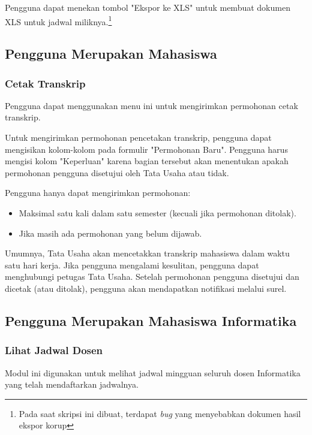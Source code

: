 Pengguna dapat menekan tombol "Ekspor ke XLS" untuk membuat dokumen XLS untuk jadwal miliknya.\footnote{Pada saat skripsi ini dibuat, terdapat \textit{bug} yang menyebabkan dokumen hasil ekspor korup}

\subsection{Pengguna Merupakan Mahasiswa}
\label{sec:bluetape_mahasiswa}

\subsubsection{Cetak Transkrip}
\label{sec:bluetape_cetak_transkrip}
Pengguna dapat menggunakan menu ini untuk mengirimkan permohonan cetak transkrip.

Untuk mengirimkan permohonan pencetakan transkrip, pengguna dapat mengisikan kolom-kolom pada formulir "Permohonan Baru". Pengguna harus mengisi kolom "Keperluan" karena bagian tersebut akan menentukan apakah permohonan pengguna disetujui oleh Tata Usaha atau tidak.

Pengguna hanya dapat mengirimkan permohonan:
\begin{itemize}
	\item Maksimal satu kali dalam satu semester (kecuali jika permohonan ditolak).
	\item Jika masih ada permohonan yang belum dijawab.
\end{itemize}

Umumnya, Tata Usaha akan mencetakkan transkrip mahasiswa dalam waktu satu hari kerja. Jika pengguna mengalami kesulitan, pengguna dapat menghubungi petugas Tata Usaha. Setelah permohonan pengguna disetujui dan dicetak (atau ditolak), pengguna akan mendapatkan notifikasi melalui surel.

\subsection{Pengguna Merupakan Mahasiswa Informatika}
\label{sec:bluetape_mahasiswa_informatika}

\subsubsection{Lihat Jadwal Dosen}
\label{sec:bluetape_lihat_jadwal_dosen}

Modul ini digunakan untuk melihat jadwal mingguan seluruh dosen Informatika yang telah mendaftarkan jadwalnya.

